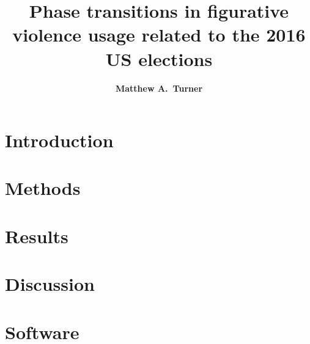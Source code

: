 \documentclass[11pt,letterpaper]{article}
\title{Phase transitions in figurative violence usage related to the 2016 US elections}
\author{{\large \bf Matthew A.~Turner}}
\begin{document}
\maketitle


% 

\section{Introduction}


\section{Methods}
\label{sec:Methods}


\section{Results}
\label{sec:Results}


\section{Discussion}





\setlength{\bibleftmargin}{.125in}
\setlength{\bibindent}{-\bibleftmargin}



\appendix

\section{Software}

\end{document}
